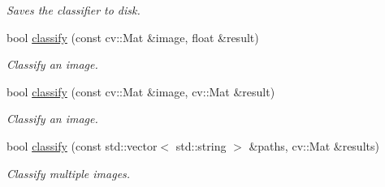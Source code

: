 \begin{DoxyCompactItemize}
\begin{DoxyCompactList}\small\item\em Saves the classifier to disk. \item\end{DoxyCompactList}\item 
bool \hyperlink{classBoWClassifier_afd7819ef860dc5f9ee45790456885262}{classify} (const cv::Mat \&image, float \&result)
\begin{DoxyCompactList}\small\item\em Classify an image. \item\end{DoxyCompactList}\item 
bool \hyperlink{classBoWClassifier_abb49e025e2e683e28ebaf38d3ddb34df}{classify} (const cv::Mat \&image, cv::Mat \&result)
\begin{DoxyCompactList}\small\item\em Classify an image. \item\end{DoxyCompactList}\item 
bool \hyperlink{classBoWClassifier_a6f3d7ed5430e4dd9f0093a1cdc909c49}{classify} (const std::vector$<$ std::string $>$ \&paths, cv::Mat \&results)
\begin{DoxyCompactList}\small\item\em Classify multiple images. \item\end{DoxyCompactList}\end{DoxyCompactItemize}
